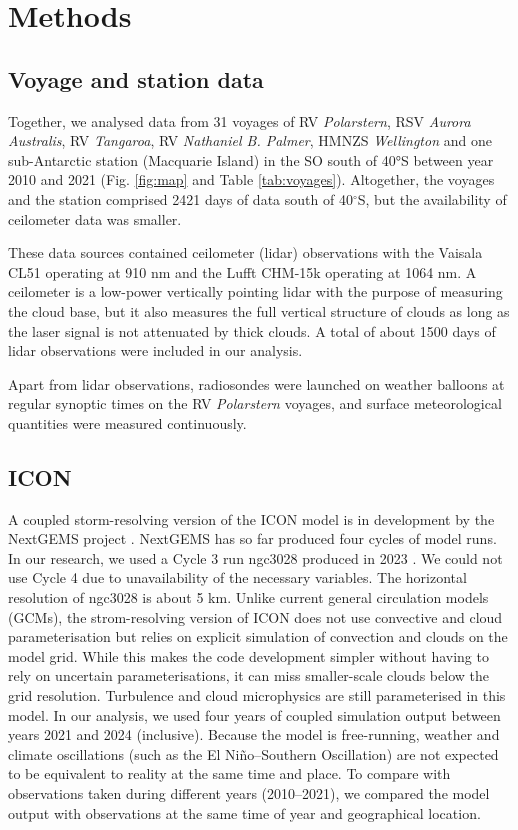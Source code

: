 \documentclass[12pt,a4paper]{article}
\begin{document}
\section{Methods}
\label{sec:methods}

\subsection{Voyage and station data}

Together, we analysed data from 31 voyages of RV \emph{Polarstern}, RSV
\emph{Aurora Australis}, RV \emph{Tangaroa}, RV \emph{Nathaniel B. Palmer},
HMNZS \emph{Wellington} and one sub-Antarctic station (Macquarie Island) in the
SO south of 40°S between year 2010 and 2021 (Fig. \ref{fig:map} and
Table \ref{tab:voyages}). Altogether, the voyages and the station comprised
2421 days of data south of 40$^\circ$S, but the availability of ceilometer data
was smaller.

These data sources contained ceilometer (lidar) observations with the Vaisala
CL51 operating at 910 nm and the Lufft CHM-15k operating at 1064 nm. A
ceilometer is a low-power vertically pointing lidar with the purpose of
measuring the cloud base, but it also measures the full vertical structure of
clouds as long as the laser signal is not attenuated by thick clouds. A total
of about 1500 days of lidar observations were included in our analysis.

Apart from lidar observations, radiosondes were launched on weather balloons
at regular synoptic times on the RV \emph{Polarstern} voyages, and surface
meteorological quantities were measured continuously.

\subsection{ICON}

A coupled storm-resolving version of the ICON model is in development by the
NextGEMS project \citep{hohenegger2023}. NextGEMS has so far produced four
cycles of model runs. In our research, we used a Cycle 3 run ngc3028 produced
in 2023 \citep{nextgems2023a,nextgems2023b}. We could not use Cycle 4 due to unavailability of
the necessary variables. The horizontal resolution of ngc3028 is about 5 km.
Unlike current general circulation models (GCMs), the strom-resolving version
of ICON does not use convective and cloud parameterisation but relies on
explicit simulation of convection and clouds on the model grid. While this
makes the code development simpler without having to rely on uncertain
parameterisations, it can miss smaller-scale clouds below the grid resolution.
Turbulence and cloud microphysics are still parameterised in this model. In our
analysis, we used four years of coupled simulation output between years 2021
and 2024 (inclusive). Because the model is free-running, weather and climate
oscillations (such as the El Niño--Southern Oscillation) are not expected to be
equivalent to reality at the same time and place. To compare with observations
taken during different years (2010--2021), we compared the model output with
observations at the same time of year and geographical location.
\end{document}

